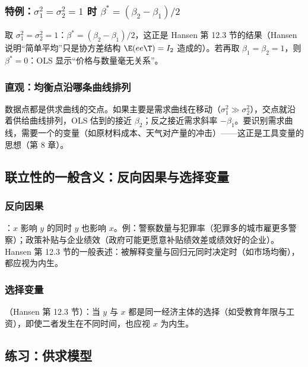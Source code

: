 \subsubsection{特例：\texorpdfstring{$\sigma_1^2=\sigma_2^2=1$}{sigma1\^{}2 = sigma2\^{}2 = 1} 时 \texorpdfstring{$\beta^*=(\beta_2-\beta_1)/2$}{beta* = (beta2 - beta1)/2}}

取 $\sigma_1^2=\sigma_2^2=1$：$\beta^*=(\beta_2-\beta_1)/2$，这正是 Hansen 第 12.3 节的结果（Hansen 说明“简单平均”只是协方差结构 $\E(ee\T)=I_2$ 造成的）。若再取 $\beta_1=\beta_2=1$，则 $\beta^*=0$：OLS 显示“价格与数量毫无关系”。

\subsubsection{直观：均衡点沿哪条曲线排列}

数据点都是供求曲线的交点。如果主要是需求曲线在移动（$\sigma_1^2\gg\sigma_2^2$），交点就沿着供给曲线排列，OLS 估到的接近 $\beta_2$；反之接近需求斜率 $-\beta_1$。要识别需求曲线，需要一个的变量（如原材料成本、天气对产量的冲击）——这正是工具变量的思想（第 8 章）。

\subsection{联立性的一般含义：反向因果与选择变量}

\subsubsection{反向因果}

：$x$ 影响 $y$ 的同时 $y$ 也影响 $x$。例：警察数量与犯罪率（犯罪多的城市雇更多警察）；政策补贴与企业绩效（政府可能更愿意补贴绩效差或绩效好的企业）。Hansen 第 12.3 节的一般表述：被解释变量与回归元同时决定时（如市场均衡），都应视为内生。

\subsubsection{选择变量}

（Hansen 第 12.3 节）：当 $y$ 与 $x$ 都是同一经济主体的选择（如受教育年限与工资），即使二者发生在不同时间，也应视 $x$ 为内生。

\subsection{练习：供求模型}

